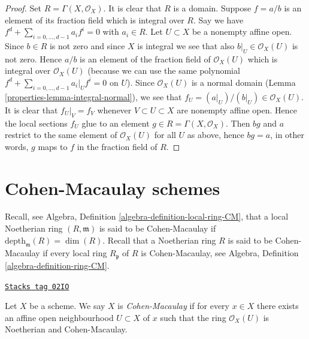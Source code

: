 \begin{proof}

Set $R = \Gamma(X, \mathcal{O}_X)$.
It is clear that $R$ is a domain.
Suppose $f = a/b$ is an element of its fraction field
which is integral over $R$. Say we have
$f^d + \sum_{i = 0, \ldots, d - 1} a_i f^i = 0$ with
$a_i \in R$. Let $U \subset X$ be a nonempty affine open.
Since $b \in R$ is not zero and since $X$ is integral we see
that also $b|_U \in \mathcal{O}_X(U)$ is not zero.
Hence $a/b$ is an element of the fraction field of
$\mathcal{O}_X(U)$ which is integral over $\mathcal{O}_X(U)$
(because we can use the same polynomial
$f^d + \sum_{i = 0, \ldots, d - 1} a_i|_U f^i = 0$ on $U$).
Since $\mathcal{O}_X(U)$ is a normal domain
(Lemma \ref{properties-lemma-integral-normal}), we see that
$f_U = (a|_U)/(b|_U) \in \mathcal{O}_X(U)$. It is clear
that $f_U|_V = f_V$ whenever $V \subset U \subset X$ are
nonempty affine open. Hence the local sections $f_U$ glue to an element
$g \in R = \Gamma(X, \mathcal{O}_X)$. Then $bg$ and $a$
restrict to the same element of $\mathcal{O}_X(U)$ for
all $U$ as above, hence $bg = a$, in other words, $g$ maps to $f$
in the fraction field of $R$.
\end{proof}

\section{Cohen-Macaulay schemes}
\label{properties-section-Cohen-Macaulay}
Recall, see Algebra, Definition \ref{algebra-definition-local-ring-CM},
that a local Noetherian ring $(R, \mathfrak m)$ is
said to be Cohen-Macaulay if $\text{depth}_{\mathfrak m}(R) = \dim(R)$.
Recall that a Noetherian ring $R$ is said to be Cohen-Macaulay if
every local ring $R_{\mathfrak p}$ of $R$ is Cohen-Macaulay,
see Algebra, Definition \ref{algebra-definition-ring-CM}.

\begin{definition}
\label{properties-definition-Cohen-Macaulay}
\href{https://stacks.math.columbia.edu/tag/02IO}{\texttt{Stacks tag 02IO}}

Let $X$ be a scheme. We say $X$ is {\it Cohen-Macaulay} if
for every $x \in X$ there exists an affine open neighbourhood
$U \subset X$ of $x$ such that the ring $\mathcal{O}_X(U)$ is
Noetherian and Cohen-Macaulay.
\end{definition}

